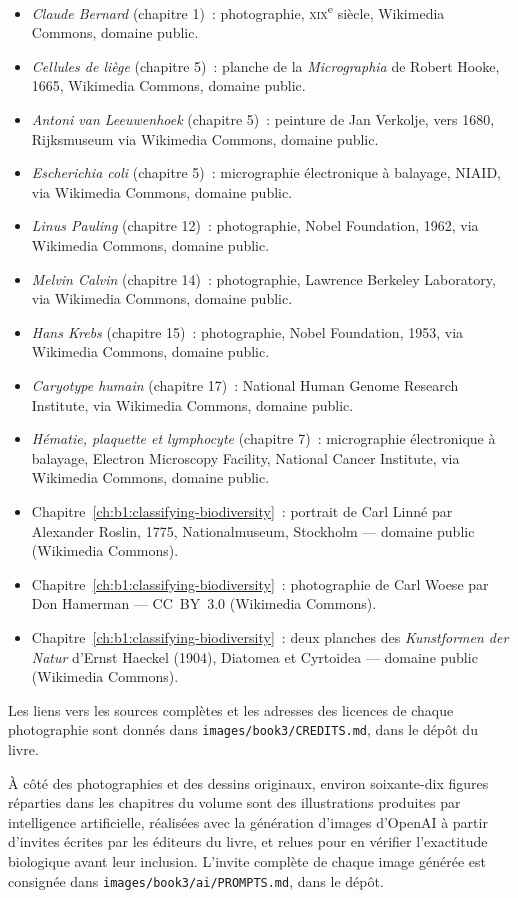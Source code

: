 \begin{itemize}
  \item \emph{Claude Bernard} (chapitre 1)~: photographie,
        \textsc{xix}\textsuperscript{e} siècle, Wikimedia Commons,
        domaine public.
  \item \emph{Cellules de liège} (chapitre 5)~: planche de la
        \emph{Micrographia} de Robert Hooke, 1665, Wikimedia Commons,
        domaine public.
  \item \emph{Antoni van Leeuwenhoek} (chapitre 5)~: peinture de Jan
        Verkolje, vers 1680, Rijksmuseum via Wikimedia Commons,
        domaine public.
  \item \emph{Escherichia coli} (chapitre 5)~: micrographie
        électronique à balayage, NIAID, via Wikimedia Commons,
        domaine public.
  \item \emph{Linus Pauling} (chapitre 12)~: photographie, Nobel
        Foundation, 1962, via Wikimedia Commons, domaine public.
  \item \emph{Melvin Calvin} (chapitre 14)~: photographie, Lawrence
        Berkeley Laboratory, via Wikimedia Commons, domaine public.
  \item \emph{Hans Krebs} (chapitre 15)~: photographie, Nobel
        Foundation, 1953, via Wikimedia Commons, domaine public.
  \item \emph{Caryotype humain} (chapitre 17)~: National Human Genome
        Research Institute, via Wikimedia Commons, domaine public.
  \item \emph{Hématie, plaquette et lymphocyte} (chapitre 7)~:
        micrographie électronique à balayage, Electron Microscopy
        Facility, National Cancer Institute, via Wikimedia Commons,
        domaine public.
  \item Chapitre~\ref{ch:b1:classifying-biodiversity}~: portrait de Carl Linné par Alexander Roslin, 1775, Nationalmuseum, Stockholm --- domaine public (Wikimedia Commons).
  \item Chapitre~\ref{ch:b1:classifying-biodiversity}~: photographie de Carl Woese par Don Hamerman --- CC~BY~3.0 (Wikimedia Commons).
  \item Chapitre~\ref{ch:b1:classifying-biodiversity}~: deux planches des \emph{Kunstformen der Natur} d'Ernst Haeckel (1904), Diatomea et Cyrtoidea --- domaine public (Wikimedia Commons).
\end{itemize}

Les liens vers les sources complètes et les adresses des licences de
chaque photographie sont donnés dans
\texttt{images/\allowbreak book3/\allowbreak CREDITS.md}, dans le dépôt du livre.

\bigskip
À côté des photographies et des dessins originaux, environ
soixante-dix figures réparties dans les chapitres du volume
sont des illustrations produites par intelligence artificielle,
réalisées avec la génération d'images d'OpenAI à partir d'invites
écrites par les éditeurs du livre, et relues pour en vérifier
l'exactitude biologique avant leur inclusion. L'invite complète de chaque image générée est
consignée dans \texttt{images/\allowbreak book3/\allowbreak ai/\allowbreak PROMPTS.md},
dans le dépôt.
\par\endgroup
\clearpage
